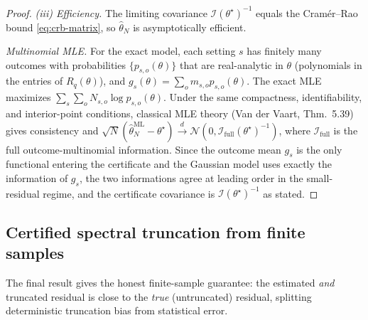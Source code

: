 \documentclass[aps,prxquantum,reprint,superscriptaddress,nofootinbib,amsmath,amssymb]{revtex4-2}
\begin{document}
\begin{proof}
\emph{(iii) Efficiency.} The limiting covariance $\mathcal{I}(\theta^\star)^{-1}$ equals the Cram\'er--Rao bound \eqref{eq:crb-matrix}, so $\hat\theta_N$ is asymptotically efficient.

\emph{Multinomial MLE.} For the exact model, each setting $s$ has finitely many outcomes with probabilities $\{p_{s,o}(\theta)\}$ that are real-analytic in $\theta$ (polynomials in the entries of $R_q(\theta)$), and $g_s(\theta)=\sum_o m_{s,o}p_{s,o}(\theta)$. The exact MLE maximizes $\sum_s\sum_o N_{s,o}\log p_{s,o}(\theta)$. Under the same compactness, identifiability, and interior-point conditions, classical MLE theory (Van der Vaart, Thm.~5.39) gives consistency and $\sqrt N(\hat\theta^{\mathrm{ML}}_N-\theta^\star)\xrightarrow{d}\mathcal{N}(0,\mathcal{I}_{\mathrm{full}}(\theta^\star)^{-1})$, where $\mathcal{I}_{\mathrm{full}}$ is the full outcome-multinomial information. Since the outcome mean $g_s$ is the only functional entering the certificate and the Gaussian model uses exactly the information of $g_s$, the two informations agree at leading order in the small-residual regime, and the certificate covariance is $\mathcal{I}(\theta^\star)^{-1}$ as stated.
\end{proof}

\subsection{Certified spectral truncation from finite samples}
\label{app:inference-certified}

The final result gives the honest finite-sample guarantee: the estimated \emph{and} truncated residual is close to the \emph{true} (untruncated) residual, splitting deterministic truncation bias from statistical error.
\end{document}
